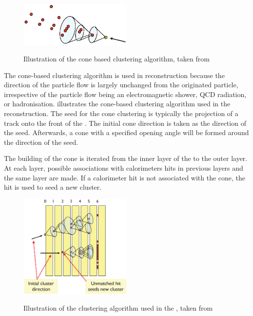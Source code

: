
\begin{figure}[tbph]
\centering
{\includegraphics[width=0.5\textwidth]{pandora/coneClustering}}%
\caption{Illustration of the cone based clustering algorithm, taken from \cite{Marshall:pandoraLC}}
\label{fig:pandoraConeClustering}
\end{figure}

The cone-based clustering algorithm is used in \pandora reconstruction because the direction of the particle flow is largely unchanged from the originated particle, irrespective of  the particle flow being an electromagnetic shower, QCD radiation, or hadronisation.  illustrates the cone-based clustering algorithm used in the \pandora reconstruction. The seed for the cone clustering is typically the projection of a track onto the front of the \ECAL.  The initial cone direction is taken as the direction of the seed. Afterwards, a cone with a specified opening angle will be formed around the direction of the seed.



The building of the cone is iterated from the inner layer of the \ECAL to the outer layer. At each layer, possible associations with calorimeters hits in previous layers and the same layer are made. If a calorimeter hit is not associated with the cone, the hit is used to seed a new cluster. %

\begin{figure}[tbph]
\centering
{\includegraphics[width=0.5\textwidth]{pandora/coneClustering2}}%
\caption{Illustration of the clustering algorithm used  in the \pandora, taken from \cite{Marshall:pandoraLC}}
\label{fig:pandoraConeClustering2}
\end{figure}

